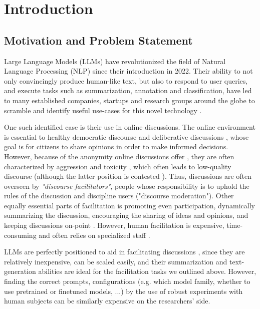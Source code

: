 %
\chapter{Introduction}
\label{sec:intro}

\section{Motivation and Problem Statement}
\label{sec:intro:motivation}

Large Language Models (LLMs) have revolutionized the field of Natural Language Processing (NLP) since their introduction in 2022. Their ability to not only convincingly produce human-like text, but also to respond to user queries, and execute tasks such as summarization, annotation and classification, have led to many established companies, startups and research groups around the globe to scramble and identify useful use-cases for this novel technology \cite{HadiASO, Zhou2024LargeLM, Hutchinson2024LLMAssistedVA}.

One such identified case is their use in online discussions. The online environment is essential to  healthy democratic discourse \cite{WrightDemocracy, Janssen2005, Papacharissi2004DemocracyOC} and deliberative discussions \cite{small2021polis}, whose goal is for citizens to share opinions in order to make informed decisions. However, because of the anonymity online discussions offer \cite{Avalle2024PersistentIP}, they are often characterized by aggression and toxicity \cite{XiaToxicity}, which often leads to low-quality discourse \cite{WrightDemocracy} (although the latter position is contested \cite{Papacharissi2004DemocracyOC}). Thus, discussions are often overseen by \textit{"discourse facilitators"}, people whose responsibility is to uphold the rules of the discussion and discipline users ("discourse moderation"). Other equally essential parts of facilitation is promoting even participation, dynamically summarizing the discussion, encouraging the sharing of ideas and opinions, and keeping discussions on-point \cite{Harvard2024, Wang2008StudentfacilitatorsRI}. However, human facilitation is expensive, time-consuming and often relies on specialized staff \cite{small-polis-llm}.

LLMs are perfectly positioned to aid in facilitating discussions \cite{small-polis-llm}, since they are relatively inexpensive, can be scaled easily, and their summarization and text-generation abilities are ideal for the facilitation tasks we outlined above. However, finding the correct prompts, configurations (e.g. which model family, whether to use pretrained or finetuned models, ...) by the use of robust experiments with human subjects can be similarly expensive on the researchers' side.

